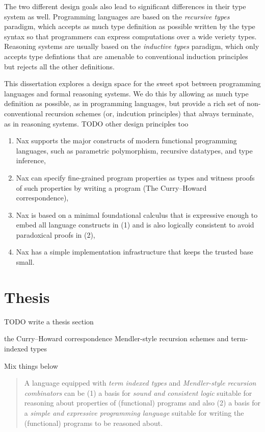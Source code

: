 The two different design goals also lead to significant differences
in their type system as well.
Programming languages are based on the \emph{recursive types} paradigm,
which accepts as much type definition as possible written by the type syntax
so that programmers can express computations over a wide veriety types.
Reasoning systems are usually based on the \emph{inductive types} paradigm,
which only accepts type defintions that are amenable to
conventional induction principles but rejects all the other definitions.

This dissertation explores a design space for the sweet spot between 
programming languages and formal reasoning systems. We do this by
allowing as much type definition as possible, as in programming languages,
but provide a rich set of non-conventional recursion schemes
(or, indcution principles) that always terminate, as in reasoning systems.
TODO other design principles too

\begin{enumerate}[(1)]
 \item Nax supports the major constructs of modern
         functional programming languages, such as
         parametric polymorphism, recursive datatypes, and type inference,
 \item Nax can specify fine-grained program properties as types and
         witness proofs of such properties by writing a program
         (The Curry--Howard correspondence),
 \item Nax is based on a minimal foundational calculus
 that is expressive enough to embed all language constructs in (1)
 and is also logically consistent to avoid paradoxical proofs in (2),
 \item Nax has a simple implementation infrastructure
         that keeps the trusted base small.
\end{enumerate}


\section{Thesis}\label{sec:intro:thesis}
TODO write a thesis section

the Curry--Howard correspondence
Mendler-style recursion schemes and term-indexed types

Mix things below

\begin{quote}
A language equipped with \emph{term indexed types} and
\emph{Mendler-style recursion combinators} can be 
(1) a basis for \emph{sound and consistent logic}
suitable for reasoning about properties of (functional) programs
and also
(2) a basis for a \emph{simple and expressive programming language}
suitable for writing the (functional) programs to be reasoned about.
\end{quote}



